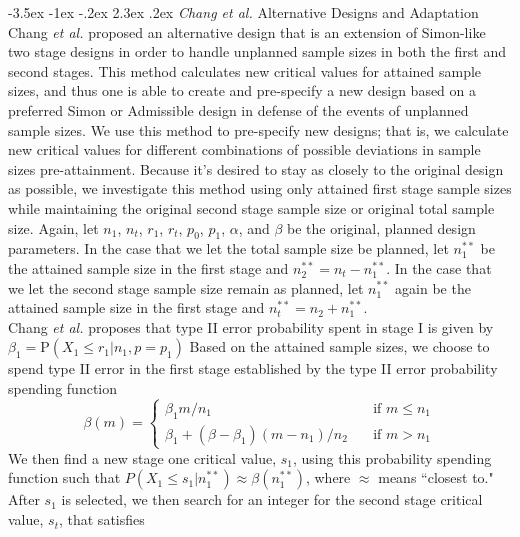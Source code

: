 \documentclass[12pt]{report}\usepackage[]{graphicx}\usepackage[]{color}
\makeatletter
\newlength{\li}\setlength{\li}{14.48pt}
\newlength{\di}\setlength{\di}{-3.5mm}
\renewcommand\section{ \@startsection {section}{1}{\z@}%
                                   {-3.5ex \@plus -1ex \@minus -.2ex}%
                                   {2.3ex \@plus.2ex}%
                                   {\centering\large\fontfamily{qcs}\selectfont}}
\makeatother
\begin{document}
\section{\textit{Chang et al.} Alternative Designs and Adaptation}
Chang \textit{et al.} \cite{Chang} proposed an alternative design that is an extension of Simon-like two stage designs in order to handle unplanned sample sizes in both the first and second stages. This method calculates new critical values for attained sample sizes, and thus one is able to create and pre-specify a new design based on a preferred Simon or Admissible design in defense of the events of unplanned sample sizes. We use this method to pre-specify new designs; that is, we calculate new critical values for different combinations of possible deviations in sample sizes pre-attainment. Because it's desired to stay as closely to the original design as possible, we investigate this method using only attained first stage sample sizes while maintaining the original second stage sample size or original total sample size. Again, let $n_1$, $n_t$, $r_1$, $r_t$, $p_0$, $p_1$, $\alpha$, and $\beta$ be the original, planned design parameters. In the case that we let the total sample size be planned, let $n_1^{\ast \ast}$ be the attained sample size in the first stage and $n_2^{\ast\ast} = n_t - n_1^{\ast\ast}$. In the case that we let the second stage sample size remain as planned, let $n_1^{\ast\ast}$ again be the attained sample size in the first stage and $n_t^{\ast\ast} = n_2 + n_1^{\ast\ast}$. \\
\indent Chang \textit{et al.} proposes that type II error probability spent in stage I is given by $\beta_1 = \mbox{P}(X_1 \leq r_1 \vert n_1, p = p_1)$ Based on the attained sample sizes, we choose to spend type II error in the first stage established by the type II error probability spending function 
$$
\beta(m) = \left\{
        \begin{array}{ll}
            \beta_1 m/n_1 & \quad \text{if } m\leq n_1 \\
            \beta_1 + (\beta - \beta_1)(m - n_1)/n_2 & \quad \text{if } m > n_1
        \end{array}
    \right.
$$
We then find a new stage one critical value, $s_1$, using this probability spending function such that $P(X_1 \leq s_1 | n_1^{\ast\ast}) \approx \beta(n_1^{\ast\ast})$, where $\approx$ means ``closest to." After $s_1$ is selected, we then search for an integer for the second stage critical value, $s_t$, that satisfies
\end{document}
